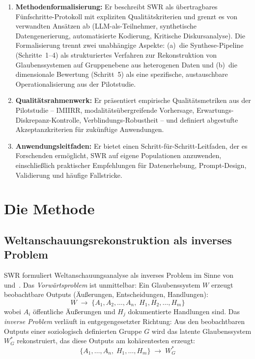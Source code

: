 \documentclass[11pt,a4paper]{article}
\begin{document}
\begin{enumerate}[nosep]
  \item \textbf{Methodenformalisierung:} Er beschreibt SWR als übertragbares Fünfschritte-Protokoll mit expliziten Qualitätskriterien und grenzt es von verwandten Ansätzen ab (LLM-als-Teilnehmer, synthetische Datengenerierung, automatisierte Kodierung, Kritische Diskursanalyse). Die Formalisierung trennt zwei unabhängige Aspekte: (a)~die Synthese-Pipeline (Schritte~1--4) als strukturiertes Verfahren zur Rekonstruktion von Glaubenssystemen auf Gruppenebene aus heterogenen Daten und (b)~die dimensionale Bewertung (Schritt~5) als eine spezifische, austauschbare Operationalisierung aus der Pilotstudie.
  \item \textbf{Qualitätsrahmenwerk:} Er präsentiert empirische Qualitätsmetriken aus der Pilotstudie -- IMIIRR, modalitätsübergreifende Vorhersage, Erwartungs-Diskrepanz-Kontrolle, Verblindungs-Robustheit -- und definiert abgestufte Akzeptanzkriterien für zukünftige Anwendungen.
  \item \textbf{Anwendungsleitfaden:} Er bietet einen Schritt-für-Schritt-Leitfaden, der es Forschenden ermöglicht, SWR auf eigene Populationen anzuwenden, einschließlich praktischer Empfehlungen für Datenerhebung, Prompt-Design, Validierung und häufige Fallstricke.
\end{enumerate}


\section{Die Methode}
\label{sec:method}

\subsection{Weltanschauungsrekonstruktion als inverses Problem}
\label{sec:method:inverse}

SWR formuliert Weltanschauungsanalyse als inverses Problem im Sinne von~\citet{Hadamard1923} und~\citet{Tarantola2005}. Das \emph{Vorwärtsproblem} ist unmittelbar: Ein Glaubenssystem $W$ erzeugt beobachtbare Outputs (Äußerungen, Entscheidungen, Handlungen):
\begin{equation}
  W \;\longrightarrow\; \{A_1, A_2, \ldots, A_n,\; H_1, H_2, \ldots, H_m\}
  \label{eq:forward}
\end{equation}
wobei $A_i$ öffentliche Äußerungen und $H_j$ dokumentierte Handlungen sind. Das \emph{inverse Problem} verläuft in entgegengesetzter Richtung: Aus den beobachtbaren Outputs einer soziologisch definierten Gruppe $G$ wird das latente Glaubenssystem $W_G^*$ rekonstruiert, das diese Outputs am kohärentesten erzeugt:
\begin{equation}
  \{A_1, \ldots, A_n,\; H_1, \ldots, H_m\} \;\longrightarrow\; W_G^*
  \label{eq:inverse}
\end{equation}
\end{document}

